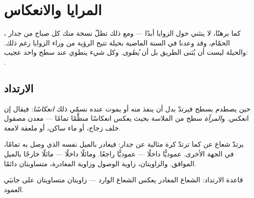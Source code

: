 \chapter{المرايا والانعكاس}\label{ch:g5:mirrors-reflection}

، كما برهنّا، لا ينثني حول الزوايا أبدًا --- ومع ذلك تطلّ
نسخة منك كل صباح من جدار الحمّام، وقد وعدنا في السنة الماضية
بحيلة تتيح الرؤية من وراء الزوايا رغم ذلك. والحيلة ليست أن يُثنى
الطريق بل أن \emph{يُطوى}. وكل شيء ينطوي عند سطح واحد عجيب:
.

\section{الارتداد}

\begin{definition}[الانعكاس]\label{def:g5:mirrors-reflection:reflection}
حين يصطدم  بسطح فيرتدّ بدل أن ينفذ منه أو يموت عنده نسمّي
ذلك \emph{انعكاسًا}: فيقال إن  انعكس.
و\emph{المرآة} سطح من الملاسة بحيث يعكس 
انعكاسًا منظَّمًا تمامًا --- معدن مصقول خلف زجاج، أو ماء ساكن،
أو ملعقة لامعة.
\end{definition}

\begin{proposition}\label{prop:g5:mirrors-reflection:bounce}
يرتدّ شعاع  عن  كما ترتدّ كرة مثالية عن جدار: فيغادر
بالميل نفسه الذي وصل به تمامًا، في الجهة الأخرى. عموديًّا داخلًا
--- عموديًّا راجعًا. ومائلًا داخلًا --- مائلًا خارجًا بالميل
الموافق. والزاويتان، زاوية الوصول وزاوية المغادرة، متساويتان
دائمًا.
\end{proposition}

\begin{omfigure}

{\small قاعدة الارتداد: الشعاع المغادر يعكس الشعاع الوارد ---
زاويتان متساويتان على جانبَي العمود.}
\end{omfigure}

